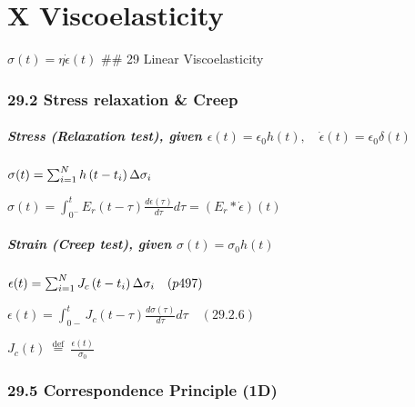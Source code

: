 \hypertarget{x-viscoelasticity}{%
\section{X Viscoelasticity}\label{x-viscoelasticity}}

\(\sigma(t)=\eta \dot{\epsilon}(t)\) \#\# 29 Linear Viscoelasticity

\hypertarget{stress-relaxation-creep}{%
\subsubsection{29.2 Stress relaxation \&
Creep}\label{stress-relaxation-creep}}

\hypertarget{stress-relaxation-test-given-epsilontepsilon_0-ht-quad-dotepsilontepsilon_0-deltat}{%
\subparagraph{\texorpdfstring{Stress (Relaxation test), given
\(\epsilon(t)=\epsilon_{0} h(t), \quad \dot{\epsilon}(t)=\epsilon_{0} \delta(t)\)}{Stress (Relaxation test), given \textbackslash epsilon(t)=\textbackslash epsilon\_\{0\} h(t), \textbackslash quad \textbackslash dot\{\textbackslash epsilon\}(t)=\textbackslash epsilon\_\{0\} \textbackslash delta(t)}}\label{stress-relaxation-test-given-epsilontepsilon_0-ht-quad-dotepsilontepsilon_0-deltat}}

\(\sigma(t)=\sum_{i=1}^{N} h\left(t-t_{i}\right) \Delta \sigma_{i}\\\)

\(\sigma(t)=\int_{0^{-}}^{t} E_{r}(t-\tau) \frac{d \epsilon(\tau)}{d \tau} d \tau =\left(E_{r} * \dot{\epsilon}\right)(t)\)

\hypertarget{strain-creep-test-given-sigmatsigma_0-ht}{%
\subparagraph{\texorpdfstring{Strain (Creep test), given
\(\sigma(t)=\sigma_{0} h(t)\)}{Strain (Creep test), given \textbackslash sigma(t)=\textbackslash sigma\_\{0\} h(t)}}\label{strain-creep-test-given-sigmatsigma_0-ht}}

\(\epsilon(t)=\sum_{i=1}^{N} J_{c}\left(t-t_{i}\right) \Delta \sigma_{i}\quad(p497)\\\)

\(\epsilon(t)=\int_{0-}^{t} J_{c}(t-\tau) \frac{d \sigma(\tau)}{d \tau} d \tau\quad(29.2.6)\)

\(J_{c}(t) \stackrel{\text { def }}{=} \frac{\epsilon(t)}{\sigma_{0}}\)

\hypertarget{correspondence-principle-1d}{%
\subsubsection{29.5 Correspondence Principle
(1D)}\label{correspondence-principle-1d}}

